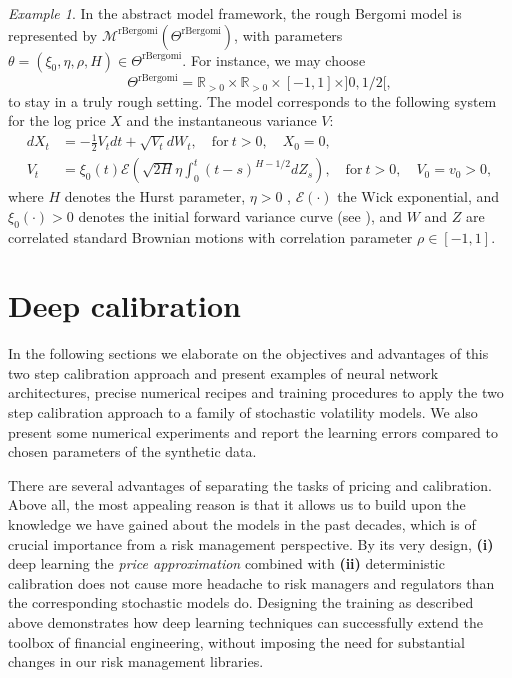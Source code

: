 \documentclass{article}
\theoremstyle{remark}
\newtheorem{example}{Example}
\newcommand{\RR}{\mathbb{R}}
\begin{document}
\begin{example}
  \label{ex:rBergomi}
  In the abstract model framework, the rough Bergomi model \cite{BFG15} is
  represented by
  $\mathcal{M}^{\mathrm{rBergomi}}(\Theta^{\mathrm{rBergomi}})$, with
  parameters $\theta = (\xi_0,\eta,\rho,H)\in \Theta^{\mathrm{rBergomi}}$. For
  instance, we may choose
  \begin{equation*}
    \Theta^{\mathrm{rBergomi}} = \RR_{>0} \times \RR_{>0} \times [-1,1] \times ]0,1/2[,
  \end{equation*}
  to stay in a truly rough setting. The model
  corresponds to the following system for the log price $X$ and the
  instantaneous variance $V$:
  \begin{subequations}
    \label{eq:rbergomi}
    \begin{align}
      dX_t&=-\frac{1}{2} V_t dt +\sqrt{V_t} dW_t,\quad \textrm{for} \ t>0, \quad X_0=0, \\
      V_t&=\xi_0(t)\mathcal{E}\left(\sqrt{2H}\eta \int_0^t
           (t-s)^{H-1/2}dZ_s\right),\quad \textrm{for} \ t>0, \quad V_0=v_0>0, 
    \end{align}
  \end{subequations}
  where $H$ denotes the Hurst parameter, $\eta>0$ ,
  $\mathcal{E}(\cdot)$ the Wick exponential, and
  $\xi_0(\cdot) >0$ denotes the initial forward variance curve (see
  \cite[Section 6]{BergomiBook}), and $W$ and $Z$ are correlated standard
  Brownian motions with correlation parameter $\rho\in [-1,1]$.
\end{example}


\section{Deep calibration}
\label{sec:pricing}


In the following sections we
elaborate on the objectives and advantages of this two step calibration
approach and present examples of neural network architectures, precise
numerical recipes and training procedures to apply the two step calibration
approach to a family of stochastic volatility models. We also present some
numerical experiments and report the learning errors compared to chosen parameters of the synthetic data.

There are several advantages of separating the tasks of pricing and
calibration. Above
all, the most appealing reason is that it allows us to build upon the
knowledge we have gained about the models in the past decades, which is of
crucial importance from a risk management perspective. By its very design,
\textbf{(i)} deep learning the \emph{price approximation} combined with
\textbf{(ii)} deterministic calibration does not cause more headache to risk
managers and regulators than the corresponding stochastic models do.
Designing the training as described above demonstrates how deep learning
techniques can successfully extend the toolbox of financial engineering,
without imposing the need for substantial changes in our risk management libraries.
\end{document}
